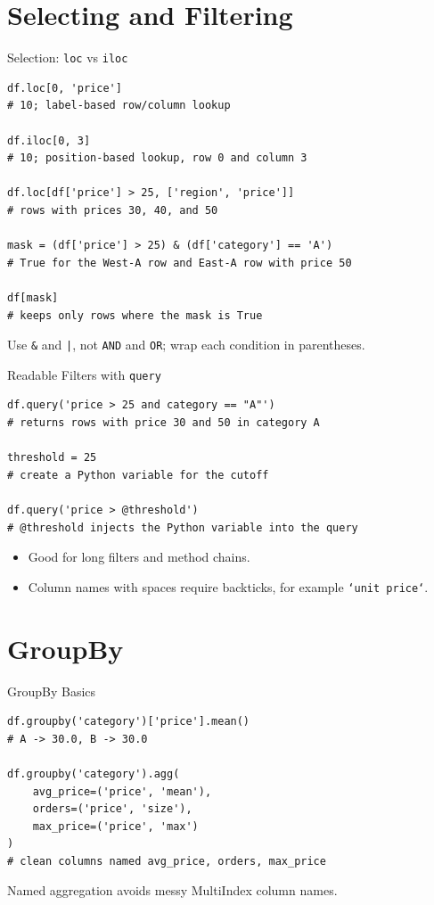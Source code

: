 \documentclass[11pt,aspectratio=43]{beamer}
\begin{document}
\section{Selecting and Filtering}

\begin{frame}[fragile]{Selection: \texttt{loc} vs \texttt{iloc}}
  \begin{lstlisting}
df.loc[0, 'price']
# 10; label-based row/column lookup

df.iloc[0, 3]
# 10; position-based lookup, row 0 and column 3

df.loc[df['price'] > 25, ['region', 'price']]
# rows with prices 30, 40, and 50

mask = (df['price'] > 25) & (df['category'] == 'A')
# True for the West-A row and East-A row with price 50

df[mask]
# keeps only rows where the mask is True
  \end{lstlisting}
  Use \texttt{\&} and \texttt{|}, not \texttt{AND} and \texttt{OR}; wrap each condition in parentheses.
\end{frame}

\begin{frame}[fragile]{Readable Filters with \texttt{query}}
  \begin{lstlisting}
df.query('price > 25 and category == "A"')
# returns rows with price 30 and 50 in category A

threshold = 25
# create a Python variable for the cutoff

df.query('price > @threshold')
# @threshold injects the Python variable into the query
  \end{lstlisting}
  \begin{itemize}
    \item Good for long filters and method chains.
    \item Column names with spaces require backticks, for example \texttt{`unit price`}.
  \end{itemize}
\end{frame}

\section{GroupBy}

\begin{frame}[fragile]{GroupBy Basics}
  \begin{lstlisting}
df.groupby('category')['price'].mean()
# A -> 30.0, B -> 30.0

df.groupby('category').agg(
    avg_price=('price', 'mean'),
    orders=('price', 'size'),
    max_price=('price', 'max')
)
# clean columns named avg_price, orders, max_price
  \end{lstlisting}
  Named aggregation avoids messy MultiIndex column names.
\end{frame}
\end{document}
